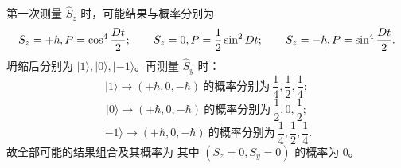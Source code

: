 \begin{question}
\begin{solution}
第一次测量 $\hat S_z$ 时，可能结果与概率分别为
\[
S_z=+\hbar,\\ P=\cos^4\frac{Dt}{2};
\qquad
S_z=0,\\ P=\frac12\sin^2 Dt;
\qquad
S_z=-\hbar,\\ P=\sin^4\frac{Dt}{2}.
\]
坍缩后分别为 $|1\rangle,|0\rangle,|-1\rangle$。再测量 $\hat S_y$ 时：
\[
|1\rangle \to (+\hbar,0,-\hbar)\ \text{的概率分别为}\ \frac14,\frac12,\frac14;
\]
\[
|0\rangle \to (+\hbar,0,-\hbar)\ \text{的概率分别为}\ \frac12,0,\frac12;
\]
\[
|-1\rangle \to (+\hbar,0,-\hbar)\ \text{的概率分别为}\ \frac14,\frac12,\frac14.
\]
故全部可能的结果组合及其概率为
其中 $(S_z=0,S_y=0)$ 的概率为 $0$。
\end{solution}
\end{question}

